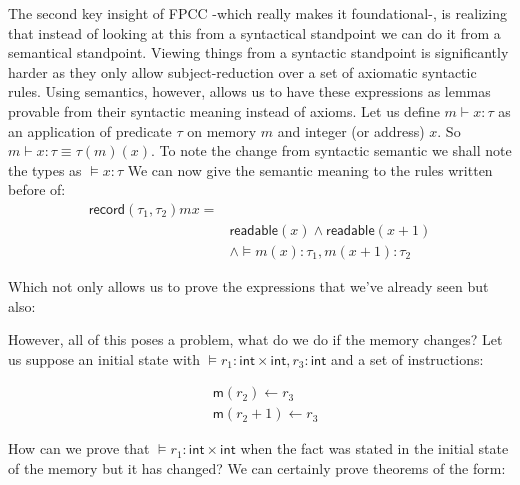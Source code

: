 \documentclass{article}
\begin{document}
The second key insight of FPCC -which really makes it 
foundational-,  is realizing that instead of looking
at this from a syntactical standpoint we can do it 
from a semantical standpoint. Viewing things from a 
syntactic standpoint is significantly harder as they
only allow subject-reduction over a set of axiomatic 
syntactic rules. Using semantics, however, allows us
to have these expressions as lemmas provable from 
their syntactic meaning instead of axioms. Let us 
define $m\vdash x:\tau$ as an application of predicate
$\tau$ on memory $m$ and integer (or address) $x$.
So $m\vdash x:\tau \equiv \tau (m)(x)$. To note the 
change from syntactic semantic we shall note the 
types as $\models x:\tau$ We can now give the 
semantic meaning to the rules written before of:
\begin{align*}
  \mathsf{record}(\tau_1,\tau_2)mx=&\\
  &\mathsf{readable}(x)\wedge\mathsf{readable}(x+1)\\
  &\wedge \models m(x):\tau_1, m(x+1):\tau_2
\end{align*}

Which not only allows us to prove the expressions
that we've already seen but also:

\begin{prooftree}
\end{prooftree}

However, all of this poses a problem, what do we 
do if the memory changes? Let us suppose an initial 
state with 
$\models r_1: \mathsf{int}\times\mathsf{int}, r_3: 
\mathsf{int}$ and a set of instructions:

\begin{align*}
  &\mathsf{m}(r_2)\leftarrow r_3\\
  &\mathsf{m}(r_2+1)\leftarrow r_3
\end{align*}

How can we prove that 
$\models r_1: \mathsf{int}\times\mathsf{int}$ when 
the fact was stated in the initial state of the 
memory but it has changed? We can certainly prove 
theorems of the form:

\begin{prooftree}
\end{prooftree}
\end{document}
